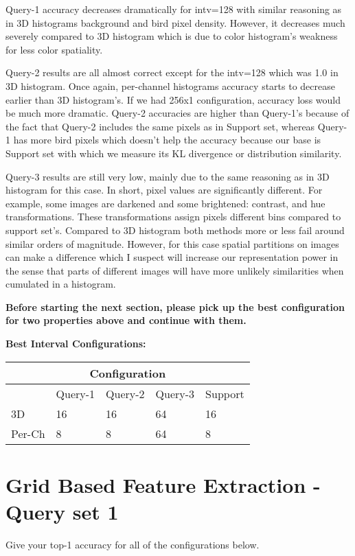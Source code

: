 \documentclass[12pt]{article}
\begin{document}
Query-1 accuracy decreases dramatically for intv=128 with similar reasoning 
as in 3D histograms background and bird pixel density. However, it decreases
much severely compared to 3D histogram which is due to color histogram's weakness
for less color spatiality.

Query-2 results are all almost correct except for the intv=128 which was 
1.0 in 3D histogram. Once again, per-channel histograms accuracy starts to decrease earlier
than 3D histogram's. If we had 256x1 configuration, accuracy loss would be much more dramatic.
Query-2 accuracies are higher than Query-1's because of the fact that 
Query-2 includes the same pixels as in Support set, whereas Query-1 has
more bird pixels which doesn't help the accuracy because our base is Support set
with which we measure its KL divergence or distribution similarity.

Query-3 results are still very low, mainly due to the same reasoning 
as in 3D histogram for this case. In short, pixel values are significantly different.
For example, some images are darkened and some brightened: contrast, and hue transformations.
These transformations assign pixels different bins compared to support set's.
Compared to 3D histogram both methods more or less fail around similar orders of magnitude.
However, for this case spatial partitions on images can make a difference which I suspect
will increase our representation power in the sense that parts of different images
will have more unlikely similarities when cumulated in a histogram.


\textbf{Before starting the next section, please pick up the best configuration for two properties above and continue with them.}

\vspace*{0.5cm}
\textbf{Best Interval Configurations:}

\begin{tabular}{ |p{1.5cm}||p{2cm}|p{2cm}|p{2cm}|p{2cm}|  }
    \hline
    \multicolumn{5}{|c|}{Configuration} \\
    \hline
     & Query-1 & Query-2 & Query-3 & Support \\
    \hline
    3D & 16 & 16 &  64  & 16 \\
    \hline
    Per-Ch & 8 & 8 & 64  & 8 \\
    \hline
\end{tabular}

\section{Grid Based Feature Extraction - Query set 1}
Give your top-1 accuracy for all of the configurations below.
\end{document}
